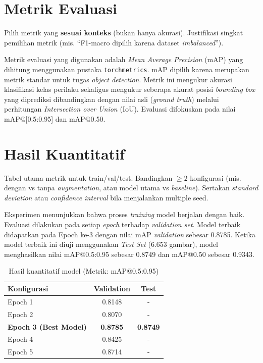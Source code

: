\documentclass[11pt,a4paper,oneside]{report}
\begin{document}
\section{Metrik Evaluasi}
\begin{petunjuk}
Pilih metrik yang \textbf{sesuai konteks} (bukan hanya akurasi). Justifikasi singkat pemilihan metrik (mis. ``F1-macro dipilih karena dataset \textit{imbalanced}'').
\end{petunjuk}

Metrik evaluasi yang digunakan adalah \textit{Mean Average Precision} (mAP) yang dihitung menggunakan pustaka \texttt{torchmetrics}. mAP dipilih karena merupakan metrik standar untuk tugas \textit{object detection}. Metrik ini mengukur akurasi klasifikasi kelas perilaku sekaligus mengukur seberapa akurat posisi \textit{bounding box} yang diprediksi dibandingkan dengan nilai asli (\textit{ground truth}) melalui perhitungan \textit{Intersection over Union} (IoU). Evaluasi difokuskan pada nilai mAP@[0.5:0.95] dan mAP@0.50.

\section{Hasil Kuantitatif}
\begin{petunjuk}
Tabel utama metrik untuk train/val/test. Bandingkan $\geq 2$ konfigurasi (mis. dengan vs tanpa \textit{augmentation}, atau model utama vs \textit{baseline}). Sertakan \textit{standard deviation} atau \textit{confidence interval} bila menjalankan multiple seed.
\end{petunjuk}

Eksperimen menunjukkan bahwa proses \textit{training} model berjalan dengan baik. Evaluasi dilakukan pada setiap \textit{epoch} terhadap \textit{validation set}. Model terbaik didapatkan pada Epoch ke-3 dengan nilai mAP \textit{validation} sebesar 0.8785. Ketika model terbaik ini diuji menggunakan \textit{Test Set} (6.653 gambar), model menghasilkan nilai mAP@0.5:0.95 sebesar 0.8749 dan mAP@0.50 sebesar 0.9343.

\begin{table}[h!]
\centering
\caption{Hasil kuantitatif model (Metrik: mAP@0.5:0.95)}
\label{tab:hasil}
\begin{tabular}{lcc}
\toprule
\textbf{Konfigurasi} & \textbf{Validation} & \textbf{Test} \\
\midrule
Epoch 1     & 0.8148 & - \\
Epoch 2     & 0.8070 & - \\
\textbf{Epoch 3 (Best Model)} & \textbf{0.8785} & \textbf{0.8749} \\
Epoch 4     & 0.8425 & - \\
Epoch 5     & 0.8714 & - \\
\bottomrule
\end{tabular}
\end{table}
\end{document}

